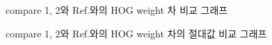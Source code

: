 \documentclass[a4paper]{article}
\begin{document}
\begin{figure}
    \begin{center}
        \caption{compare 1, 2와 Ref.와의 HOG weight 차 비교 그래프}
        \label{fig:refSubGraph}
    \end{center}
\end{figure}
\begin{figure}
    \begin{center}
        \caption{compare 1, 2와 Ref.와의 HOG weight 차의 절대값 비교 그래프}
        \label{fig:refSubABSGraph}
    \end{center}
\end{figure}
\end{document}
